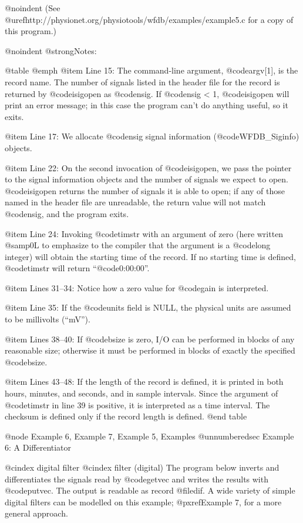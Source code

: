 {{{{{{{{{@noindent
(See @uref{http://physionet.org/physiotools/wfdb/examples/example5.c}
for a copy of this program.)

@noindent
@strong{Notes:}

@table @emph
@item Line 15:
The command-line argument, @code{argv[1]}, is the record name.  The
number of signals listed in the header file for the record is returned by
@code{isigopen} as @code{nsig}.  If @code{nsig} < 1, @code{isigopen} will
print an error message; in this case the program can't do anything useful,
so it exits.

@item Line 17:
We allocate @code{nsig} signal information (@code{WFDB_Siginfo}) objects.

@item Line 22:
On the second invocation of @code{isigopen}, we pass the pointer to the
signal information objects and the number of signals we expect to open.
@code{isigopen} returns the number of signals it is able to open;  if
any of those named in the header file are unreadable, the return value
will not match @code{nsig}, and the program exits.

@item Line 24:
Invoking @code{timstr} with an argument of zero (here written @samp{0L}
to emphasize to the compiler that the argument is a @code{long} integer)
will obtain the starting time of the record.  If no starting time is
defined, @code{timstr} will return ``@code{0:00:00}''.

@item Lines 31--34:
Notice how a zero value for @code{gain} is interpreted.

@item Line 35:
If the @code{units} field is NULL, the physical units are assumed to be
millivolts (``mV'').

@item Lines 38--40:
If @code{bsize} is zero, I/O can be performed in blocks of any reasonable
size;  otherwise it must be performed in blocks of exactly the specified
@code{bsize}.

@item Lines 43--48:
If the length of the record is defined, it is printed in both hours,
minutes, and seconds, and in sample intervals.  Since the argument of
@code{timstr} in line 39 is positive, it is interpreted as a time
interval.  The checksum is defined only if the record length is
defined.
@end table

@node     Example 6, Example 7, Example 5, Examples
@unnumberedsec Example 6: A Differentiator

@cindex digital filter
@cindex filter (digital)
The program below inverts and differentiates the signals read by
@code{getvec} and writes the results with @code{putvec}.  The output is
readable as record @file{dif}.  A wide variety of simple digital filters
can be modelled on this example; @pxref{Example 7}, for a more general
approach.

}}}}}}}}}
